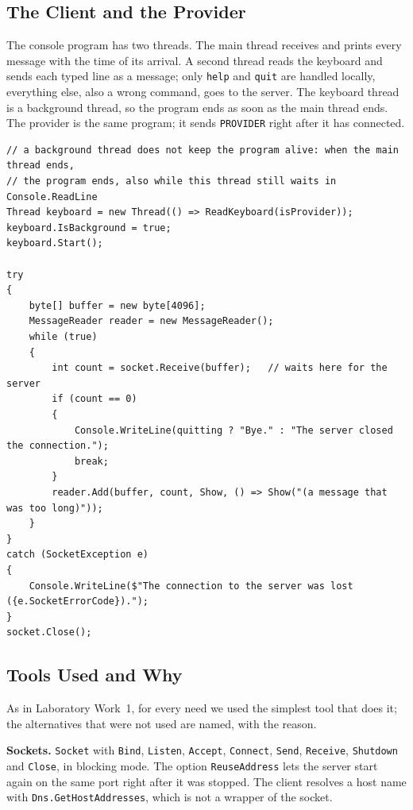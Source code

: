 \documentclass[12pt,a4paper]{article}
\begin{document}
\subsection{The Client and the Provider}

The console program has two threads. The main thread receives and prints every message with the time of its arrival. A second thread reads the keyboard and sends each typed line as a message; only \texttt{help} and \texttt{quit} are handled locally, everything else, also a wrong command, goes to the server. The keyboard thread is a background thread, so the program ends as soon as the main thread ends. The provider is the same program; it sends \texttt{PROVIDER} right after it has connected.

\begin{lstlisting}[style=csharp,caption={The two threads of Client.cs}]
// a background thread does not keep the program alive: when the main thread ends,
// the program ends, also while this thread still waits in Console.ReadLine
Thread keyboard = new Thread(() => ReadKeyboard(isProvider));
keyboard.IsBackground = true;
keyboard.Start();

try
{
    byte[] buffer = new byte[4096];
    MessageReader reader = new MessageReader();
    while (true)
    {
        int count = socket.Receive(buffer);   // waits here for the server
        if (count == 0)
        {
            Console.WriteLine(quitting ? "Bye." : "The server closed the connection.");
            break;
        }
        reader.Add(buffer, count, Show, () => Show("(a message that was too long)"));
    }
}
catch (SocketException e)
{
    Console.WriteLine($"The connection to the server was lost ({e.SocketErrorCode}).");
}
socket.Close();
\end{lstlisting}

\subsection{Tools Used and Why}

As in Laboratory Work~1, for every need we used the simplest tool that does it; the alternatives that were not used are named, with the reason.

\textbf{Sockets.} \texttt{Socket} with \texttt{Bind}, \texttt{Listen}, \texttt{Accept}, \texttt{Connect}, \texttt{Send}, \texttt{Receive}, \texttt{Shutdown} and \texttt{Close}, in blocking mode. The option \texttt{ReuseAddress} lets the server start again on the same port right after it was stopped. The client resolves a host name with \texttt{Dns.GetHostAddresses}, which is not a wrapper of the socket.
\end{document}
